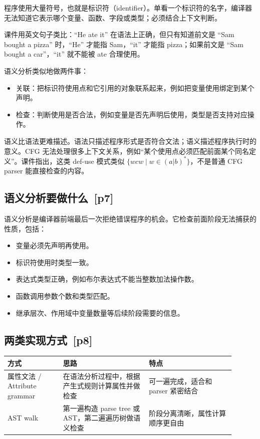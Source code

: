 \documentclass[UTF8,fontset=none,11pt]{ctexart}
\newcommand{\pg}[1]{\texorpdfstring{{\small\color{graytext}\,[p#1]}}{ [p#1]}}
\begin{document}
程序使用大量符号，也就是标识符（identifier）。单看一个标识符的名字，编译器无法知道它表示哪个变量、函数、字段或类型；必须结合上下文判断。

课件用英文句子类比：``He ate it'' 在语法上正确，但只有知道前文是 ``Sam bought a pizza'' 时，``He'' 才能指 Sam，``it'' 才能指 pizza；如果前文是 ``Sam bought a car''，``it'' 就不能被 ate 合理使用。

语义分析类似地做两件事：

\begin{itemize}
  \item 关联：把标识符使用点和它引用的对象联系起来，例如把变量使用绑定到某个声明。
  \item 检查：判断使用是否合法，例如变量是否先声明后使用，类型是否支持对应操作。
\end{itemize}

语义比语法更难描述。语法只描述程序形式是否符合文法；语义描述程序执行时的意义。CFG 无法处理很多上下文关系，例如“某个使用点必须匹配前面某个同名定义”。课件指出，这类 def-use 模式类似 \(\{wcw\mid w\in(a|b)^*\}\)，不是普通 CFG parser 能直接检查的内容。

\subsection{语义分析要做什么 \pg{7}}

语义分析是编译器前端最后一次拒绝错误程序的机会。它检查前面阶段无法捕获的性质，包括：

\begin{itemize}
  \item 变量必须先声明再使用。
  \item 标识符使用时类型一致。
  \item 表达式类型正确，例如布尔表达式不能当整数加法操作数。
  \item 函数调用参数个数和类型匹配。
  \item 继承层次、作用域中变量数量等后续阶段需要的信息。
\end{itemize}

\subsection{两类实现方式 \pg{8}}

\begin{longtable}{L{0.22\linewidth}L{0.34\linewidth}L{0.34\linewidth}}
\toprule
方式 & 思路 & 特点 \\
\midrule
属性文法 / Attribute grammar & 在语法分析过程中，根据产生式规则计算属性并做检查 & 可一遍完成，适合和 parser 紧密结合 \\
AST walk & 第一遍构造 parse tree 或 AST，第二遍遍历树做语义检查 & 阶段分离清晰，属性计算顺序更自由 \\
\bottomrule
\end{longtable}
\end{document}
